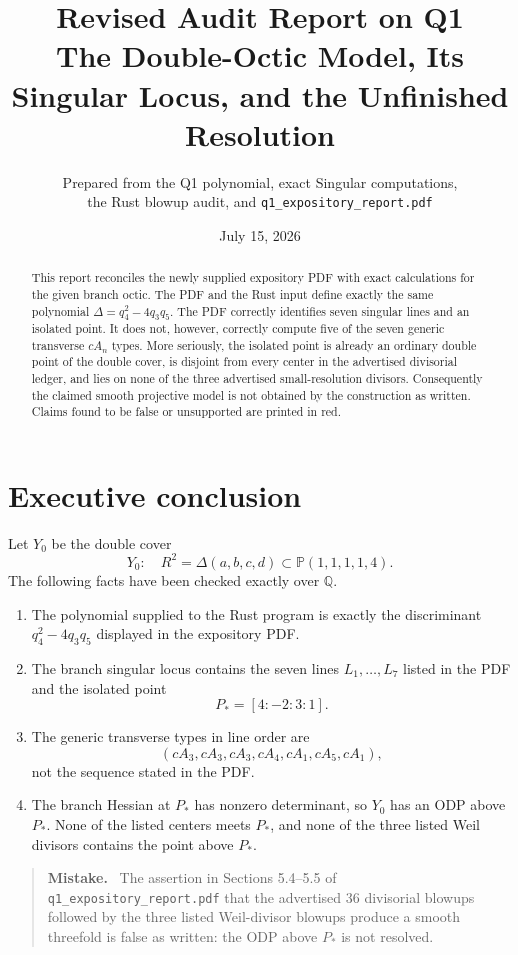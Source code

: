 \documentclass[11pt]{article}
\title{Revised Audit Report on Q1\\
The Double-Octic Model, Its Singular Locus, and the Unfinished Resolution}
\author{Prepared from the Q1 polynomial, exact Singular computations,\\
the Rust blowup audit, and \texttt{q1\_expository\_report.pdf}}
\date{July 15, 2026}
\newenvironment{mistake}
  {\begin{quote}\color{mistakered}\textbf{Mistake.}\ }
  {\end{quote}}
\begin{document}
\maketitle

\begin{abstract}
This report reconciles the newly supplied expository PDF with exact calculations for the
given branch octic.  The PDF and the Rust input define exactly the same polynomial
$\Delta=q_4^2-4q_3q_5$.  The PDF correctly identifies seven singular lines and an
isolated point.  It does not, however, correctly compute five of the seven generic
transverse $cA_n$ types.  More seriously, the isolated point is already an ordinary
double point of the double cover, is disjoint from every center in the advertised
divisorial ledger, and lies on none of the three advertised small-resolution divisors.
Consequently the claimed smooth projective model is not obtained by the construction as
written.  Claims found to be false or unsupported are printed in red.
\end{abstract}

\tableofcontents

\section{Executive conclusion}

Let $Y_0$ be the double cover
\[
  Y_0:\quad R^2=\Delta(a,b,c,d)
  \subset \mathbb P(1,1,1,1,4).
\]
The following facts have been checked exactly over $\mathbb Q$.

\begin{enumerate}
  \item The polynomial supplied to the Rust program is exactly the discriminant
  $q_4^2-4q_3q_5$ displayed in the expository PDF.
  \item The branch singular locus contains the seven lines $L_1,\ldots,L_7$ listed in
  the PDF and the isolated point
  \[
    P_*=[4:-2:3:1].
  \]
  \item The generic transverse types in line order are
  \[
    (cA_3,cA_3,cA_3,cA_4,cA_1,cA_5,cA_1),
  \]
  not the sequence stated in the PDF.
  \item The branch Hessian at $P_*$ has nonzero determinant, so $Y_0$ has an ODP above
  $P_*$.  None of the listed centers meets $P_*$, and none of the three listed Weil
  divisors contains the point above $P_*$.
\end{enumerate}

\begin{mistake}
The assertion in Sections 5.4--5.5 of \texttt{q1\_expository\_report.pdf} that the
advertised 36 divisorial blowups followed by the three listed Weil-divisor blowups produce
a smooth threefold is false as written: the ODP above $P_*$ is not resolved.
\end{mistake}
\end{document}
